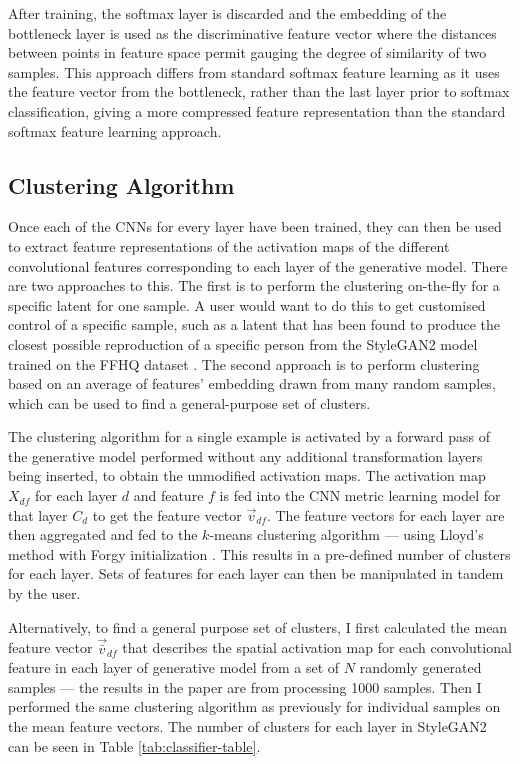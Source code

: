 After training, the softmax layer is discarded and the embedding of the bottleneck layer is used as the discriminative feature vector where the distances between points in feature space permit gauging the degree of similarity of two samples. 
This approach differs from standard softmax feature learning as it uses the feature vector from the bottleneck, rather than the last layer prior to softmax classification, giving a more compressed feature representation than the standard softmax feature learning approach.

\subsection{Clustering Algorithm}

Once each of the CNNs for every layer have been trained, they can then be used to extract feature representations of the activation maps of the different convolutional features corresponding to each layer of the generative model.
There are two approaches to this. The first is to perform the clustering on-the-fly for a specific latent for one sample. A user would want to do this to get customised control of a specific sample, such as a latent that has been found to produce the closest possible reproduction of a specific person from the StyleGAN2 model trained on the FFHQ dataset \citep{abdal2019image2stylegan,karras2019analyzing}. 
The second approach is to perform clustering based on an average of features' embedding drawn from many random samples, which can be used to find a general-purpose set of clusters.

The clustering algorithm for a single example is activated by a forward pass of the generative model performed without any additional transformation layers being inserted, to obtain the unmodified activation maps. 
The activation map $X_{df}$ for each layer $d$ and feature $f$ is fed into the CNN metric learning model for that layer $C_d$ to get the feature vector $\vec{v}_{df}$. 
The feature vectors for each layer are then aggregated and fed to the $k$-means clustering algorithm --- using Lloyd's method \citep{lloyd1982least} with Forgy initialization \citep{forgy1965cluster, celebi2013comparative}. 
This results in a pre-defined number of clusters for each layer. 
Sets of features for each layer can then be manipulated in tandem by the user.

Alternatively, to find a general purpose set of clusters, I first calculated the mean feature vector $\vec{\bar{v}}_{df}$ that describes the spatial activation map for each convolutional feature in each layer of generative model from a set of $N$ randomly generated samples --- the results in the paper are from processing 1000 samples. 
Then I performed the same clustering algorithm as previously for individual samples on the mean feature vectors. 
The number of clusters for each layer in StyleGAN2 can be seen in Table \ref{tab:classifier-table}.

